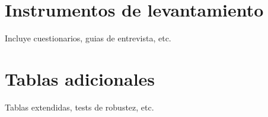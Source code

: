 \documentclass[
  spanish,
  a4paper,
  oneside]{scrbook}
\begin{document}
\cleardoublepage
{}
{}
\appendix

\chapter{Instrumentos de
levantamiento}\label{instrumentos-de-levantamiento}

Incluye cuestionarios, guias de entrevista, etc.

\chapter{Tablas adicionales}\label{tablas-adicionales}

Tablas extendidas, tests de robustez, etc.


\backmatter

\mainmatter
\pagestyle{scrheadings}

\end{document}
